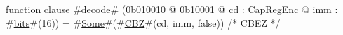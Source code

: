 function clause #\hyperref[sailMIPSzdecode]{decode}# (0b010010 @ 0b10001 @ cd : CapRegEnc @ imm : #\hyperref[sailMIPSzbits]{bits}#(16)) = #\hyperref[sailMIPSzSome]{Some}#(#\hyperref[sailMIPSzCBZ]{CBZ}#(cd, imm, false)) /* CBEZ */
